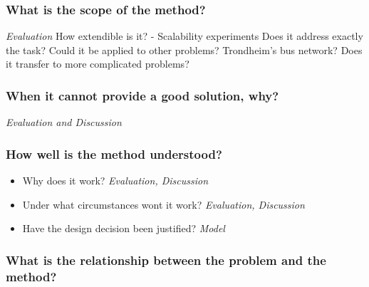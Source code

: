 \subsubsection{What is the scope of the method?}
\emph{\color{orange} Evaluation}
How extendible is it? - Scalability experiments
Does it address exactly the task?
Could it be applied to other problems? Trondheim's bus network?
Does it transfer to more complicated problems?

\subsubsection{When it cannot provide a good solution, why?}
\emph{\color{orange} Evaluation and Discussion}

\subsubsection{How well is the method understood?}
\begin{itemize}
\item Why does it work? \emph{\color{orange} Evaluation, Discussion}
\item Under what circumstances wont it work? \emph{\color{orange} Evaluation, Discussion}
\item Have the design decision been justified? \emph{\color{orange} Model}
\end{itemize}

\subsubsection{What is the relationship between the problem and the method?}







